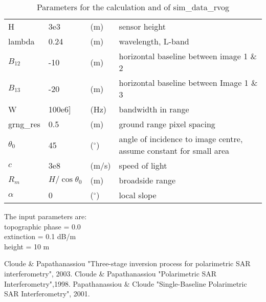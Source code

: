 \begin{table}[h]
\footnotesize
\begin{tabular}{l@{= }lll}
H & 3e3 & (m) & sensor height\\
lambda & 0.24 & (m) & wavelength, L-band\\
$B_{12}$ & -10 & (m)  & horizontal baseline between image 1 \& 2\\
$B_{13}$ & -20 & (m) & horizontal baseline between Image 1 \& 3\\
W  & 100e6] & (Hz) & bandwidth in range\\
grng\_res & 0.5 & (m) & ground range pixel spacing\\
$\theta_0$ & 45 & ($^\circ$)  & angle of incidence to image centre, assume constant for small area\\
$c$ & 3e8 & (m/s) & speed of light\\
$R_m$ & $H/\cos\theta_0$ & (m) & broadside range\\
$\alpha$ &  0  & ($^\circ$)& local slope\\
\end{tabular}
\caption{Parameters for the calculation and of sim\_data\_rvog}
\end{table}
\noindent
The input parameters are:\\
topographic phase = 0.0\\
extinction = 0.1 dB/m\\
height = 10 m\\

\begin{thebibliography}{123}
 Cloude \& Papathanassiou "Three-stage inversion process for polarimetric SAR interferometry", 2003.
 Cloude \& Papathanassiou "Polarimetric SAR Interferometry",1998.
 Papathanassiou \& Cloude "Single-Baseline Polarimetric SAR Interferometry", 2001.
\end{thebibliography}
